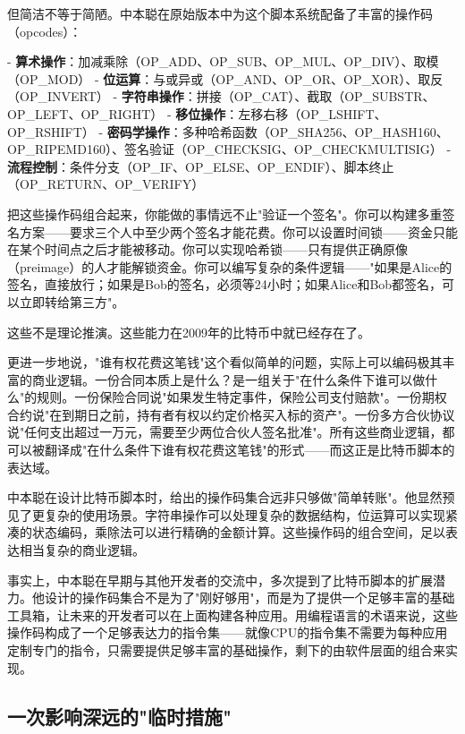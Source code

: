 \documentclass[a4paper,12pt,openany]{ctexbook}
\begin{document}
但简洁不等于简陋。中本聪在原始版本中为这个脚本系统配备了丰富的操作码（opcodes）：

- \textbf{算术操作}：加减乘除（OP\_ADD、OP\_SUB、OP\_MUL、OP\_DIV）、取模（OP\_MOD）
- \textbf{位运算}：与或异或（OP\_AND、OP\_OR、OP\_XOR）、取反（OP\_INVERT）
- \textbf{字符串操作}：拼接（OP\_CAT）、截取（OP\_SUBSTR、OP\_LEFT、OP\_RIGHT）
- \textbf{移位操作}：左移右移（OP\_LSHIFT、OP\_RSHIFT）
- \textbf{密码学操作}：多种哈希函数（OP\_SHA256、OP\_HASH160、OP\_RIPEMD160）、签名验证（OP\_CHECKSIG、OP\_CHECKMULTISIG）
- \textbf{流程控制}：条件分支（OP\_IF、OP\_ELSE、OP\_ENDIF）、脚本终止（OP\_RETURN、OP\_VERIFY）

把这些操作码组合起来，你能做的事情远不止"验证一个签名"。你可以构建多重签名方案——要求三个人中至少两个签名才能花费。你可以设置时间锁——资金只能在某个时间点之后才能被移动。你可以实现哈希锁——只有提供正确原像（preimage）的人才能解锁资金。你可以编写复杂的条件逻辑——"如果是Alice的签名，直接放行；如果是Bob的签名，必须等24小时；如果Alice和Bob都签名，可以立即转给第三方"。

这些不是理论推演。这些能力在2009年的比特币中就已经存在了。

更进一步地说，"谁有权花费这笔钱"这个看似简单的问题，实际上可以编码极其丰富的商业逻辑。一份合同本质上是什么？是一组关于"在什么条件下谁可以做什么"的规则。一份保险合同说"如果发生特定事件，保险公司支付赔款"。一份期权合约说"在到期日之前，持有者有权以约定价格买入标的资产"。一份多方合伙协议说"任何支出超过一万元，需要至少两位合伙人签名批准"。所有这些商业逻辑，都可以被翻译成"在什么条件下谁有权花费这笔钱"的形式——而这正是比特币脚本的表达域。

中本聪在设计比特币脚本时，给出的操作码集合远非只够做"简单转账"。他显然预见了更复杂的使用场景。字符串操作可以处理复杂的数据结构，位运算可以实现紧凑的状态编码，乘除法可以进行精确的金额计算。这些操作码的组合空间，足以表达相当复杂的商业逻辑。

事实上，中本聪在早期与其他开发者的交流中，多次提到了比特币脚本的扩展潜力。他设计的操作码集合不是为了"刚好够用"，而是为了提供一个足够丰富的基础工具箱，让未来的开发者可以在上面构建各种应用。用编程语言的术语来说，这些操作码构成了一个足够表达力的指令集——就像CPU的指令集不需要为每种应用定制专门的指令，只需要提供足够丰富的基础操作，剩下的由软件层面的组合来实现。


\subsection*{一次影响深远的"临时措施"}
\end{document}
